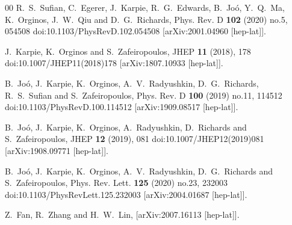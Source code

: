 \documentclass[preprint,12pt]{elsarticle}
\begin{document}
\begin{thebibliography}{00}
R.~S.~Sufian, C.~Egerer, J.~Karpie, R.~G.~Edwards, B.~Jo\'o, Y.~Q.~Ma, K.~Orginos, J.~W.~Qiu and D.~G.~Richards,
Phys. Rev. D \textbf{102} (2020) no.5, 054508
doi:10.1103/PhysRevD.102.054508
[arXiv:2001.04960 [hep-lat]].

J.~Karpie, K.~Orginos and S.~Zafeiropoulos,
JHEP \textbf{11} (2018), 178
doi:10.1007/JHEP11(2018)178
[arXiv:1807.10933 [hep-lat]].

B.~Jo\'o, J.~Karpie, K.~Orginos, A.~V.~Radyushkin, D.~G.~Richards, R.~S.~Sufian and S.~Zafeiropoulos,
Phys. Rev. D \textbf{100} (2019) no.11, 114512
doi:10.1103/PhysRevD.100.114512
[arXiv:1909.08517 [hep-lat]].

B.~Jo\'o, J.~Karpie, K.~Orginos, A.~Radyushkin, D.~Richards and S.~Zafeiropoulos,
JHEP \textbf{12} (2019), 081
doi:10.1007/JHEP12(2019)081
[arXiv:1908.09771 [hep-lat]].

B.~Jo\'o, J.~Karpie, K.~Orginos, A.~V.~Radyushkin, D.~G.~Richards and S.~Zafeiropoulos,
Phys. Rev. Lett. \textbf{125} (2020) no.23, 232003
doi:10.1103/PhysRevLett.125.232003
[arXiv:2004.01687 [hep-lat]].

Z.~Fan, R.~Zhang and H.~W.~Lin,
[arXiv:2007.16113 [hep-lat]].

\end{thebibliography}
\end{document}
